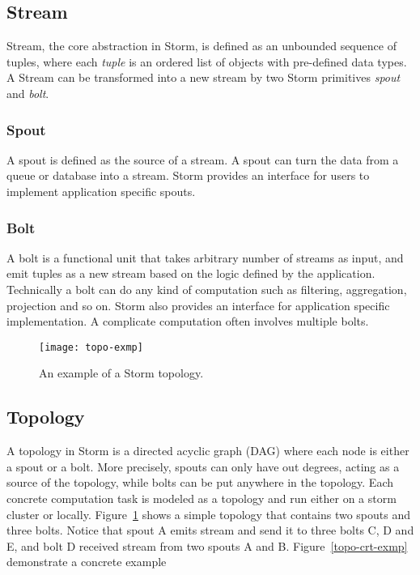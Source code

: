 \documentclass[conference, twocolumn, twoside, 11pt]{IEEEtran}
\theoremstyle{definition}
\begin{document}
\subsection{Stream}
Stream, the core abstraction in Storm, is defined as an unbounded sequence of tuples, where each \emph{tuple} is an ordered list of objects with pre-defined data types. A Stream can be transformed into a new stream by two Storm primitives \emph{spout} and \emph{bolt}.

\subsubsection{Spout}
A spout is defined as the source of a stream. A spout can turn the data from a queue or database into a stream. Storm provides an  interface for users to implement application specific spouts.

\subsubsection{Bolt}
A bolt is a functional unit that takes arbitrary number of streams as input, and emit tuples as a new stream based on the logic defined by the application. Technically a bolt can do any kind of computation such as filtering, aggregation, projection and so on. Storm also provides an interface for application specific implementation. A complicate computation often involves multiple bolts.
\begin{figure}[hbt]
\centering
\texttt{[image: topo-exmp]}
\caption{An example of a Storm topology.}
\label{topo-exmp}
\end{figure}

\subsection{Topology}\label{storm}
A topology in Storm is a directed acyclic graph (DAG) where each node is either a spout or a bolt. More precisely, spouts can only have out degrees, acting as a source of the topology, while bolts can be put anywhere in the topology. Each concrete computation task is modeled as a topology and run either on a storm cluster or locally.
Figure~\ref{topo-exmp} shows a simple topology that contains two spouts and three bolts. Notice that spout A emits stream and send it to three bolts C, D and E, and bolt D received stream from two spouts A and B. Figure~\ref{topo-crt-exmp} demonstrate a concrete example
\end{document}
